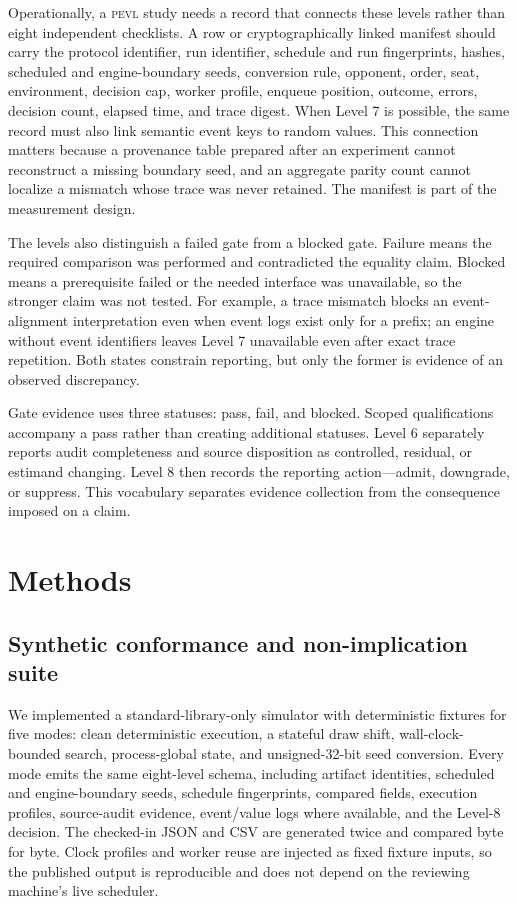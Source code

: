 \documentclass[aps,reprint,superscriptaddress,longbibliography,floatfix]{revtex4-2}
\newcommand{\PEVL}{\textsc{pevl}}
\begin{document}
Operationally, a \PEVL{} study needs a record that connects these levels rather
than eight independent checklists.  A row or cryptographically linked manifest
should carry the protocol identifier, run identifier, schedule and run
fingerprints, hashes, scheduled and engine-boundary seeds, conversion rule, opponent,
order, seat, environment, decision cap, worker profile, enqueue position,
outcome, errors, decision count, elapsed time, and trace digest.  When Level 7
is possible, the same record must also link semantic event keys to random
values.  This connection matters because a provenance table prepared after an
experiment cannot reconstruct a missing boundary seed, and an aggregate parity
count cannot localize a mismatch whose trace was never retained.  The manifest
is part of the measurement design.

The levels also distinguish a failed gate from a blocked gate.  Failure means
the required comparison was performed and contradicted the equality claim.
Blocked means a prerequisite failed or the needed interface was unavailable,
so the stronger claim was not tested.  For example, a trace mismatch blocks an
event-alignment interpretation even when event logs exist only for a prefix;
an engine without event identifiers leaves Level 7 unavailable even after exact
trace repetition.  Both states constrain reporting, but only the former is
evidence of an observed discrepancy.

Gate evidence uses three statuses: pass, fail, and blocked.  Scoped
qualifications accompany a pass rather than creating additional statuses.
Level 6 separately reports audit completeness and source disposition as
controlled, residual, or estimand changing.  Level 8 then records the reporting
action---admit, downgrade, or suppress.  This vocabulary separates evidence
collection from the consequence imposed on a claim.

\section{Methods}

\subsection{Synthetic conformance and non-implication suite}

We implemented a standard-library-only simulator with deterministic fixtures
for five modes: clean deterministic execution, a stateful draw shift,
wall-clock-bounded search, process-global state, and unsigned-32-bit seed
conversion.  Every mode emits the same eight-level schema, including artifact
identities, scheduled and engine-boundary seeds, schedule fingerprints, compared
fields, execution profiles, source-audit evidence, event/value logs where
available, and the Level-8 decision.  The checked-in JSON and CSV are generated
twice and compared byte for byte.  Clock profiles and worker reuse are injected
as fixed fixture inputs, so the published output is reproducible and does not
depend on the reviewing machine's live scheduler.
\end{document}
